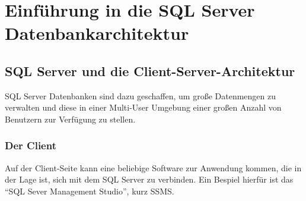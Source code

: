   \chapter{Einführung in die SQL Server Datenbankarchitektur}
    \setcounter{page}{1}
    \minitoc
\newpage
    \section{SQL Server und die Client-Server-Architektur}
      SQL Server Datenbanken sind dazu geschaffen, um große Datenmengen zu
      verwalten und diese in einer Multi-User Umgebung einer großen Anzahl von
      Benutzern zur Verfügung zu stellen.
      \subsection{Der Client}
        Auf der Client-Seite kann eine beliebige Software zur Anwendung
        kommen, die in der Lage ist, sich mit dem SQL Server zu verbinden. Ein Bespiel
        hierfür ist das \enquote{SQL Sever Management Studio}, kurz SSMS.
